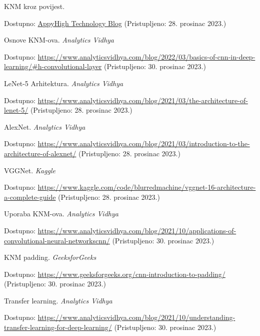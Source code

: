 
\begin{thebibliography}{9}

    KNM kroz povijest.

    Dostupno: \href{https://medium.com/appyhigh-technology-blog/convolutional-neural-networks-a-brief-history-of-their-evolution-ee3405568597}{AppyHigh Technology Blog}
    (Pristupljeno: 28. prosinac 2023.)

    Osnove KNM-ova.
    \emph{Analytics Vidhya}

    Dostupno: \url{https://www.analyticsvidhya.com/blog/2022/03/basics-of-cnn-in-deep-learning/#h-convolutional-layer}
    (Pristupljeno: 30. prosinac 2023.)

    LeNet-5 Arhitektura.
    \emph{Analytics Vidhya}

    Dostupno: \url{https://www.analyticsvidhya.com/blog/2021/03/the-architecture-of-lenet-5/}
    (Pristupljeno: 28. prosinac 2023.)

    AlexNet.
    \emph{Analytics Vidhya}

    Dostupno: \url{https://www.analyticsvidhya.com/blog/2021/03/introduction-to-the-architecture-of-alexnet/}
    (Pristupljeno: 28. prosinac 2023.)

    VGGNet.
    \emph{Kaggle}

    Dostupno: \url{https://www.kaggle.com/code/blurredmachine/vggnet-16-architecture-a-complete-guide}
    (Pristupljeno: 28. prosinac 2023.)

    Uporaba KNM-ova.
    \emph{Analytics Vidhya}

    Dostupno: \url{https://www.analyticsvidhya.com/blog/2021/10/applications-of-convolutional-neural-networkscnn/}
    (Pristupljeno: 30. prosinac 2023.)

    KNM padding.
    \emph{GeeksforGeeks}

    Dostupno: \url{https://www.geeksforgeeks.org/cnn-introduction-to-padding/}
    (Pristupljeno: 30. prosinac 2023.)

    Transfer learning.
    \emph{Analytics Vidhya}

    Dostupno: \url{https://www.analyticsvidhya.com/blog/2021/10/understanding-transfer-learning-for-deep-learning/}
    (Pristupljeno: 30. prosinac 2023.)

\end{thebibliography}
